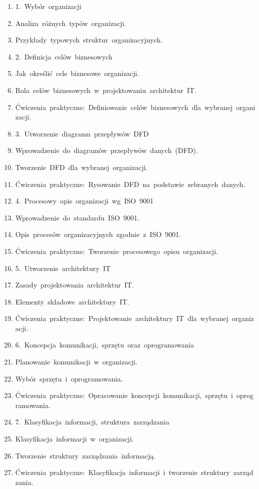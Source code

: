 \documentclass[12pt, a4paper]{article}
\begin{document}
\begin{enumerate}
  \item 1. Wybór organizacji
  \item Analiza różnych typów organizacji.
  \item Przykłady typowych struktur organizacyjnych.
  \item 2. Definicja celów biznesowych
  \item Jak określić cele biznesowe organizacji.
  \item Rola celów biznesowych w projektowaniu architektur IT.
  \item Ćwiczenia praktyczne: Definiowanie celów biznesowych dla wybranej organizacji.
  \item 3. Utworzenie diagramu przepływów DFD
  \item Wprowadzenie do diagramów przepływów danych (DFD).
  \item Tworzenie DFD dla wybranej organizacji.
  \item Ćwiczenia praktyczne: Rysowanie DFD na podstawie zebranych danych.
  \item 4. Procesowy opis organizacji wg ISO 9001
  \item Wprowadzenie do standardu ISO 9001.
  \item Opis procesów organizacyjnych zgodnie z ISO 9001.
  \item Ćwiczenia praktyczne: Tworzenie procesowego opisu organizacji.
  \item 5. Utworzenie architektury IT
  \item Zasady projektowania architektur IT.
  \item Elementy składowe architektury IT.
  \item Ćwiczenia praktyczne: Projektowanie architektury IT dla wybranej organizacji.
  \item 6. Koncepcja komunikacji, sprzętu oraz oprogramowania
  \item Planowanie komunikacji w organizacji.
  \item Wybór sprzętu i oprogramowania.
  \item Ćwiczenia praktyczne: Opracowanie koncepcji komunikacji, sprzętu i oprogramowania.
  \item 7. Klasyfikacja informacji, struktura zarządzania
  \item Klasyfikacja informacji w organizacji.
  \item Tworzenie struktury zarządzania informacją.
  \item Ćwiczenia praktyczne: Klasyfikacja informacji i tworzenie struktury zarządzania.

\end{enumerate}
\end{document}

